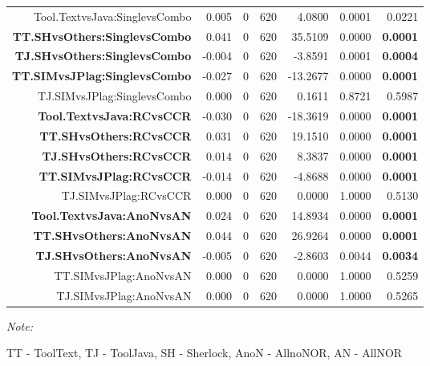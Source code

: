 \documentclass[a4paper, 12pt, oneside, openany, final, pdftex]{book}\usepackage[]{graphicx}\usepackage[]{color}
\begin{document}
\begin{table}
\begin{threeparttable}
\begin{tabular}{rrrrrrr}
Tool.TextvsJava:SinglevsCombo & 0.005 & 0 & 620 & 4.0800 & 0.0001 & 0.0221\\
\rowcolor{gray!6}  \textbf{TT.SHvsOthers:SinglevsCombo} & 0.041 & 0 & 620 & 35.5109 & 0.0000 & \textbf{0.0001}\\
\textbf{TJ.SHvsOthers:SinglevsCombo} & -0.004 & 0 & 620 & -3.8591 & 0.0001 & \textbf{0.0004}\\
\rowcolor{gray!6}  \textbf{TT.SIMvsJPlag:SinglevsCombo} & -0.027 & 0 & 620 & -13.2677 & 0.0000 & \textbf{0.0001}\\
TJ.SIMvsJPlag:SinglevsCombo & 0.000 & 0 & 620 & 0.1611 & 0.8721 & 0.5987\\
\rowcolor{gray!6}  \textbf{Tool.TextvsJava:RCvsCCR} & -0.030 & 0 & 620 & -18.3619 & 0.0000 & \textbf{0.0001}\\
\textbf{TT.SHvsOthers:RCvsCCR} & 0.031 & 0 & 620 & 19.1510 & 0.0000 & \textbf{0.0001}\\
\rowcolor{gray!6}  \textbf{TJ.SHvsOthers:RCvsCCR} & 0.014 & 0 & 620 & 8.3837 & 0.0000 & \textbf{0.0001}\\
\textbf{TT.SIMvsJPlag:RCvsCCR} & -0.014 & 0 & 620 & -4.8688 & 0.0000 & \textbf{0.0001}\\
\rowcolor{gray!6}  TJ.SIMvsJPlag:RCvsCCR & 0.000 & 0 & 620 & 0.0000 & 1.0000 & 0.5130\\
\textbf{Tool.TextvsJava:AnoNvsAN} & 0.024 & 0 & 620 & 14.8934 & 0.0000 & \textbf{0.0001}\\
\rowcolor{gray!6}  \textbf{TT.SHvsOthers:AnoNvsAN} & 0.044 & 0 & 620 & 26.9264 & 0.0000 & \textbf{0.0001}\\
\textbf{TJ.SHvsOthers:AnoNvsAN} & -0.005 & 0 & 620 & -2.8603 & 0.0044 & \textbf{0.0034}\\
\rowcolor{gray!6}  TT.SIMvsJPlag:AnoNvsAN & 0.000 & 0 & 620 & 0.0000 & 1.0000 & 0.5259\\
TJ.SIMvsJPlag:AnoNvsAN & 0.000 & 0 & 620 & 0.0000 & 1.0000 & 0.5265\\
\bottomrule
\end{tabular}
\begin{tablenotes}
\item \textit{Note: } 
\item TT - ToolText, TJ - ToolJava, SH - Sherlock, AnoN - AllnoNOR, AN - AllNOR
\end{tablenotes}
\end{threeparttable}


\end{table}
\end{document}
